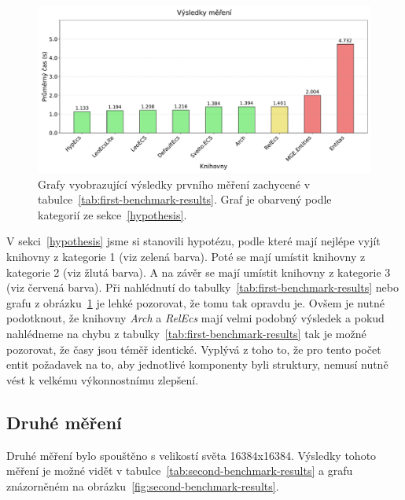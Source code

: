 \begin{figure}[!htb]
    \centering
    \includegraphics[width=1.0\linewidth]{plots/first_benchmark_results.pdf}
    \caption{Grafy vyobrazující výsledky prvního měření zachycené v tabulce~\ref{tab:first-benchmark-results}. Graf je obarvený podle kategorií ze sekce~\ref{hypothesis}.}
    \label{fig:first-benchmark-results}
\end{figure}

V sekci~\ref{hypothesis} jsme si stanovili hypotézu, podle které mají nejlépe vyjít knihovny z kategorie 1 (viz zelená barva). Poté se mají umístit knihovny z kategorie 2 (viz žlutá barva). A na závěr se mají umístit knihovny z kategorie 3 (viz červená barva). Při nahlédnutí do tabulky~\ref{tab:first-benchmark-results} nebo grafu z obrázku~\ref{fig:first-benchmark-results} je lehké pozorovat, že tomu tak opravdu je. Ovšem je nutné podotknout, že knihovny \textit{Arch} a \textit{RelEcs} mají velmi podobný výsledek a pokud nahlédneme na chybu z tabulky~\ref{tab:first-benchmark-results} tak je možné pozorovat, že časy jsou téměř identické. Vyplývá z toho to, že pro tento počet entit požadavek na to, aby jednotlivé komponenty byli struktury, nemusí nutně vést k velkému výkonnostnímu zlepšení.

\subsection{Druhé měření}
Druhé měření bylo spouštěno s velikostí světa 16384x16384. Výsledky tohoto měření je možné vidět v tabulce~\ref{tab:second-benchmark-results} a grafu znázorněném na obrázku~\ref{fig:second-benchmark-results}.


